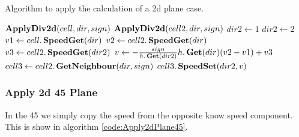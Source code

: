 \begin{algorithm}
\caption{Algorithm to apply the calculation of a 2d plane case.}\label{code:Apply2dPlane}
\begin{algorithmic}[1]
	\State $\mathop{\textbf{ApplyDiv2d}}(cell,dir,sign)$
	\State $\mathop{\textbf{ApplyDiv2d}}(cell2,dir,sign)$
	\State $dir2 \gets 1$
	\State $dir2\gets 2$ 
	\EndIf    
	\State $v1 \gets cell.\mathop{\textbf{SpeedGet}}(dir)$
	\State $v2 \gets cell2.\mathop{\textbf{SpeedGet}}(dir)$
	\State $v3 \gets cell2.\mathop{\textbf{SpeedGet}}(dir2)$
	\State $v \gets -\frac{sign}{h.\mathop{\textbf{Get}}(dir2)}h.\mathop{\textbf{Get}}(dir)(v2-v1)+v3$ 
	\State $cell3 \gets cell2.\mathop{\textbf{GetNeighbour}}(dir,sign)$
	\State $cell3.\mathop{\textbf{SpeedSet}}(dir2,v)$ 
\EndFunction
	\end{algorithmic}
\end{algorithm}

\subsubsection{Apply 2d \unit{45}{\degree} Plane}

In the \unit{45}{\degree} we simply copy the speed from the opposite know speed component.
This is show in algorithm \ref{code:Apply2dPlane45}.

